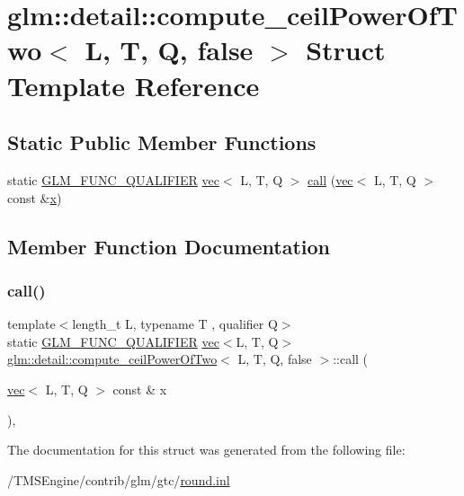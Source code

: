 \hypertarget{structglm_1_1detail_1_1compute__ceil_power_of_two_3_01_l_00_01_t_00_01_q_00_01false_01_4}{}\section{glm\+:\+:detail\+:\+:compute\+\_\+ceil\+Power\+Of\+Two$<$ L, T, Q, false $>$ Struct Template Reference}
\label{structglm_1_1detail_1_1compute__ceil_power_of_two_3_01_l_00_01_t_00_01_q_00_01false_01_4}
\subsection*{Static Public Member Functions}
\begin{DoxyCompactItemize}
\item 
static \hyperlink{setup_8hpp_a33fdea6f91c5f834105f7415e2a64407}{G\+L\+M\+\_\+\+F\+U\+N\+C\+\_\+\+Q\+U\+A\+L\+I\+F\+I\+ER} \hyperlink{structglm_1_1vec}{vec}$<$ L, T, Q $>$ \hyperlink{structglm_1_1detail_1_1compute__ceil_power_of_two_3_01_l_00_01_t_00_01_q_00_01false_01_4_af5cd62b52c3d45c1d7e0e0f1b83a32b4}{call} (\hyperlink{structglm_1_1vec}{vec}$<$ L, T, Q $>$ const \&\hyperlink{_s_d_l__opengl_8h_ad0e63d0edcdbd3d79554076bf309fd47}{x})
\end{DoxyCompactItemize}


\subsection{Member Function Documentation}
\mbox{\label{structglm_1_1detail_1_1compute__ceil_power_of_two_3_01_l_00_01_t_00_01_q_00_01false_01_4_af5cd62b52c3d45c1d7e0e0f1b83a32b4}} 
\subsubsection{\texorpdfstring{call()}{call()}}
{\footnotesize\ttfamily template$<$length\+\_\+t L, typename T , qualifier Q$>$ \\
static \hyperlink{setup_8hpp_a33fdea6f91c5f834105f7415e2a64407}{G\+L\+M\+\_\+\+F\+U\+N\+C\+\_\+\+Q\+U\+A\+L\+I\+F\+I\+ER} \hyperlink{structglm_1_1vec}{vec}$<$L, T, Q$>$ \hyperlink{structglm_1_1detail_1_1compute__ceil_power_of_two}{glm\+::detail\+::compute\+\_\+ceil\+Power\+Of\+Two}$<$ L, T, Q, false $>$\+::call (\begin{DoxyParamCaption}\item[{\hyperlink{structglm_1_1vec}{vec}$<$ L, T, Q $>$ const \&}]{x }\end{DoxyParamCaption})\hspace{0.3cm}{\ttfamily [inline]}, {\ttfamily [static]}}



The documentation for this struct was generated from the following file\+:\begin{DoxyCompactItemize}
\item 
/\+T\+M\+S\+Engine/contrib/glm/gtc/\hyperlink{round_8inl}{round.\+inl}\end{DoxyCompactItemize}
